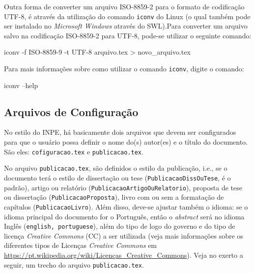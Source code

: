 Outra forma de converter um arquivo ISO-8859-2 para o formato de codificação UTF-8, é através da utilização do comando {\tt iconv} do Linux (o qual também pode ser instalado no \textit{Microsoft Windows} através do SWL).Para converter um arquivo salvo na codificação ISO-8859-2 para UTF-8, pode-se utilizar o seguinte comando:

\begin{meucomando}
iconv -f ISO-8859-9 -t UTF-8 arquivo.tex > novo_arquivo.tex
\end{meucomando}

\begin{marker}
Para mais informações sobre como utilizar o comando {\tt iconv}, digite o comando:
\smallskip
\begin{meucomando}
iconv --help
\end{meucomando}
\end{marker}

\subsection{Arquivos de Configuração}
\label{sec:configura}

No estilo do INPE, há basicamente dois arquivos que devem ser configurados para que o usuário possa definir o nome do(s) autor(es) e o título do documento. São eles: {\tt cofiguracao.tex} e {\tt publicacao.tex}.


No arquivo {\tt publicacao.tex}, são definidos o estilo da publicação, i.e., se o documento terá o estilo de dissertação ou tese ({\tt PublicacaoDissOuTese}, é o padrão), artigo ou relatório ({\tt PublicacaoArtigoOuRelatorio}), proposta de tese ou dissertação ({\tt PublicacaoProposta}), livro com ou sem a formatação de capítulos ({\tt PublicacaoLivro}). Além disso, deve-se ajustar também o idioma: se o idioma principal do documento for o Português, então o \textit{abstract} será no idioma Inglês ({\tt english, portuguese}), além do tipo de logo do governo e do tipo de licença \textit{Creative Commons} (CC) a ser utilizada (veja mais informações sobre os diferentes tipos de Licenças \textit{Creative Commons} em \url{https://pt.wikipedia.org/wiki/Licenças_Creative_Commons}). Veja no exerto a seguir, um trecho do arquivo {\tt publicacao.tex}.

